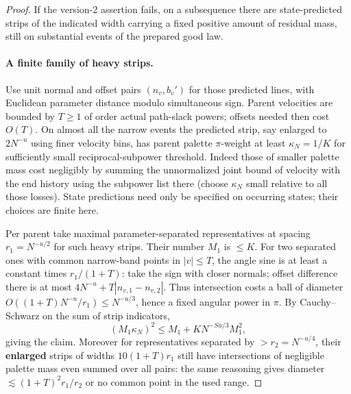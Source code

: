 \begin{proof}
If the version-2 assertion fails, on a subsequence there are
state-predicted strips of the indicated width carrying a fixed positive
amount of residual mass, still on substantial events of the prepared
good law.
\paragraph{A finite family of heavy strips.}
Use unit normal and offset pairs \((n_v,b_v')\) for those predicted lines, with Euclidean parameter distance modulo simultaneous sign. Parent velocities are bounded by \(T\ge1\) of order actual path-slack powers; offsets needed then cost \(O(T)\). On almost all the narrow events the predicted strip, say enlarged to \(2N^{-u}\) using finer velocity bins, has parent palette \(\pi\)-weight at least \(\kappa_N=1/K\) for sufficiently small reciprocal-subpower threshold. Indeed those of smaller palette mass cost negligibly by summing the unnormalized joint bound of velocity with the end history using the subpower list there (choose \(\kappa_N\) small relative to all those losses). State predictions need only be specified on occurring states; their choices are finite here.

Per parent take maximal parameter-separated representatives at spacing \(r_1=N^{-u/2}\) for such heavy strips. Their number \(M_1\) is \(\le K\). For two separated ones with common narrow-band points in \(|v|\le T\), the angle sine is at least a constant times \(r_1/(1+T)\): take the sign with closer normals; offset difference there is at most \(4N^{-u}+T|n_{v,1}-n_{v,2}|\). Thus intersection costs a ball of diameter \(O((1+T)N^{-u}/r_1)\le N^{-u/3}\), hence a fixed angular power in \(\pi\). By Cauchy–Schwarz on the sum of strip indicators,
\begin{equation}
(M_1\kappa_N)^2\le M_1+K N^{-Su/3} M_1^2,
\end{equation}
giving the claim. Moreover for representatives separated by \(>r_2=N^{-u/4}\), their \textbf{enlarged} strips of widths \(10(1+T)r_1\) still have intersections of negligible palette mass even summed over all pairs: the same reasoning gives diameter \(\lesssim (1+T)^2r_1/r_2\) or no common point in the used range.


\end{proof}
